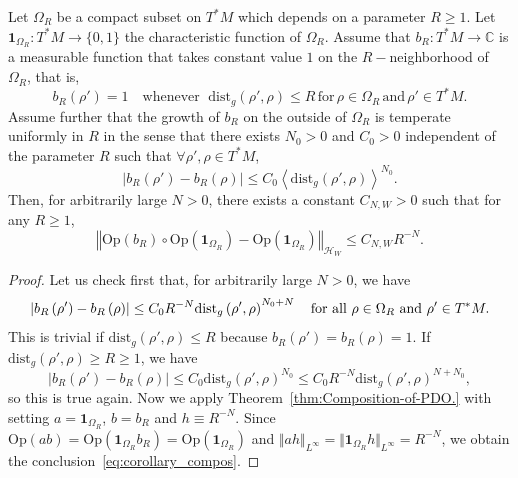 \documentclass[AHL,Unicode,longabstracts,published]{cedram}
\newcommand{\clH}{\mathcal{H}}
\newcommand{\dist}{\mathrm{dist}}
\newcommand{\Opp}{\mathrm{Op}}
\newcommand{\bbC}{\mathbb{C}}
\let\oldforall\forall
\renewcommand*{\forall}{\mathrel{\oldforall}}
\newcommand{\clH}{\mathcal{H}}
\begin{document}
\begin{cBoxB}{}
\begin{coro}\label{cor:B3}
Let $\Omega_{R}$ be a compact subset on $T^{*}M$ which depends on a parameter $R\ge1$. Let $\boldsymbol{1}_{\Omega_{R}}:T^{*}M\rightarrow\{ 0,1\} $ the characteristic function of $\Omega_{R}$. Assume that $b_{R}:T^{*}M\rightarrow\bbC$ is a measurable function that takes constant value $1$ on the $R-$neighborhood of $\Omega_{R}$, that is,
\[
b_{R}\left(\rho'\right)=1\quad\text{whenever }\; \dist_{g}\left(\rho',\rho\right)\leq R \,\text{for}\, \ensuremath{\rho\in\Omega_{R}} \,\text{and}\, \ensuremath{\rho'\in T^{*}M}.
\]
Assume further that the growth of $b_{R}$ on the outside of $\Omega_{R}$ is temperate uniformly in $R$ in the sense that there exists $N_{0}>0$ and $C_{0}>0$ independent of the parameter $R$ such that $\forall\rho',\rho\in T^{*}M$,
\[
\left|b_{R}\left(\rho'\right)-b_{R}\left(\rho\right)\right|\leq C_{0}\left\langle \dist_{g}\left(\rho',\rho\right)\right\rangle ^{N_{0}}.
\]
Then, for arbitrarily large $N>0$, there exists a constant $C_{N,W}>0$ such that for any $R\geq1$,
\begin{equation}\label{eq:corollary_compos}
\left\Vert \Opp \left(b_{R}\right)\circ\Opp \left(\boldsymbol{1}_{\Omega_{R}}\right)-\Opp \left(\boldsymbol{1}_{\Omega_{R}}\right)\right\Vert _{\clH _{W}}\leq C_{N,W}R^{-N}.
\end{equation}
\end{coro}
\end{cBoxB}

\begin{proof}
Let us check first that, for arbitrarily large $N>0$, we have
\[
\left|b_{R}\left(\rho'\right)-b_{R}\left(\rho\right)\right|\leq C_{0}R^{-N}\dist_{g}\left(\rho',\rho\right)^{N_{0}+N}\quad\text{for all \ensuremath{\rho\in\Omega_{R}} and }\rho'\in T^{*}M.
\]
This is trivial if $\dist_{g}(\rho',\rho)\leq R$ because $b_{R}(\rho')=b_{R}(\rho)=1$. If $\dist_{g}(\rho',\rho)\geq R\geq1$, we have
\[
\left|b_{R}\left(\rho'\right)-b_{R}\left(\rho\right)\right|\leq C_{0}\dist_{g}\left(\rho',\rho\right)^{N_{0}}\leq C_{0}R^{-N}\dist_{g}\left(\rho',\rho\right)^{N+N_{0}},
\]
so this is true again. Now we apply Theorem~\ref{thm:Composition-of-PDO.} with setting $a=\boldsymbol{1}_{\Omega_{R}}$, $b=b_{R}$ and $h\equiv R^{-N}$. Since $\Opp (ab)=\Opp (\boldsymbol{1}_{\Omega_{R}}b_{R})=\Opp (\boldsymbol{1}_{\Omega_{R}})$ and $\Vert ah\Vert _{L^{\infty}}=\Vert \boldsymbol{1}_{\Omega_{R}}h\Vert _{L^{\infty}}=R^{-N}$, we obtain the conclusion~\eqref{eq:corollary_compos}.
\end{proof}
\end{document}
